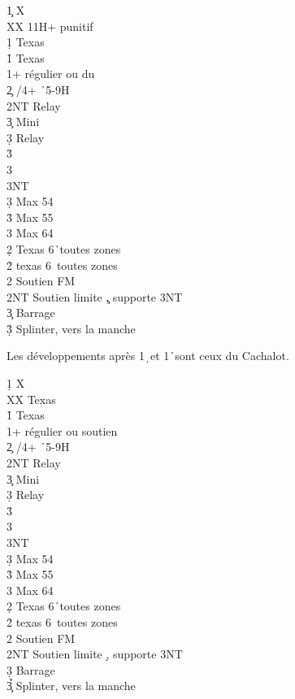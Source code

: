 \documentclass[a4paper]{article}
\begin{document}
\begin{bidtable}
1\c \> X\\
XX \> 11H+ punitif\\
1\d \> Texas \h \\
1\h \> Texas \s \\
1\s {}+ régulier ou du \d \\
2\c {} \s /4+ \h\ 5-9H\+\\
2NT \> Relay\+\\
3\c \> Mini\+\\
3\d \> Relay\+\\
3\h {}\\
3\s {}\\
3NT \-\-\\
3\d \> Max 54\\
3\h \> Max 55\\
3\s \> Max 64\-\-\\
2\d \> Texas 6\h\ toutes zones\\
2\h \> texas 6\s\ toutes zones\\
2\s \> Soutien FM \c \\
2NT \> Soutien limite \c , supporte 3NT\\
3\c \> Barrage \c \\
3\d\h\s \> Splinter, vers la manche
\end{bidtable}

Les développements après 1\d\ et 1\h\ sont ceux du Cachalot.

\begin{bidtable}
1\d \> X\\
XX \> Texas \h \\
1\h \> Texas \s \\
1\s {}+ régulier ou soutien \d \\
2\c {} \s /4+ \h\ 5-9H\+\\
2NT \> Relay\+\\
3\c \> Mini\+\\
3\d \> Relay\+\\
3\h {}\\
3\s {}\\
3NT \-\-\\
3\d \> Max 54\\
3\h \> Max 55\\
3\s \> Max 64\-\-\\
2\d \> Texas 6\h\ toutes zones\\
2\h \> texas 6\s\ toutes zones\\
2\s \> Soutien FM \d \\
2NT \> Soutien limite \d , supporte 3NT\\
3\d \> Barrage \d \\
3\c\h\s \> Splinter, vers la manche
\end{bidtable}
\end{document}
